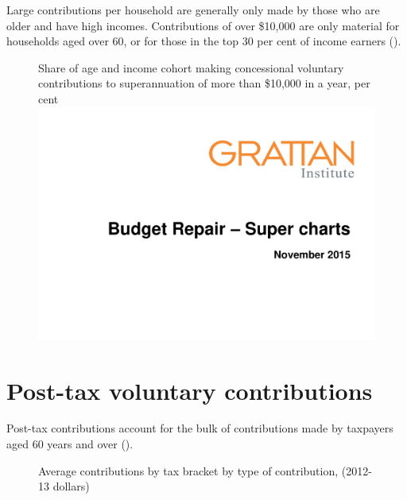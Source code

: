 \begin{subappendices}
\begin{figure}
\end{figure}

Large contributions per household are generally only made by those who are older and have high incomes. Contributions of over 
\$10,000 are only material for households aged over 60, or for those in the top 30 per cent of income earners (). 

\begin{figure}
%
{Share of age and income cohort making concessional voluntary contributions to superannuation of more than \$10,000 in a year, per cent}\label{fig:SUPER-A-7}
\includegraphics[width=\columnwidth,page=41]{super-atlas/PPTX.pdf}
\end{figure}

\section{Post-tax voluntary contributions}
Post-tax contributions account for the bulk of contributions made by taxpayers aged 60 years and over (). 

\begin{figure}
%
{Average contributions by tax bracket by type of contribution, (2012-13 dollars)}\label{fig:SUPER-A-8}


\end{figure}
\end{subappendices}
